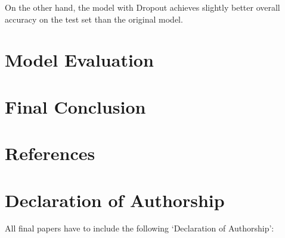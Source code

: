 \documentclass[a4paper]{article}
\begin{document}
On the other hand, the model with Dropout achieves slightly better overall accuracy on the test set than the original model.

\section{Model Evaluation}


\section{Final Conclusion}



\section*{References}







\section*{Declaration of Authorship}
All final papers have to include the following ‘Declaration of Authorship’:
\end{document}
